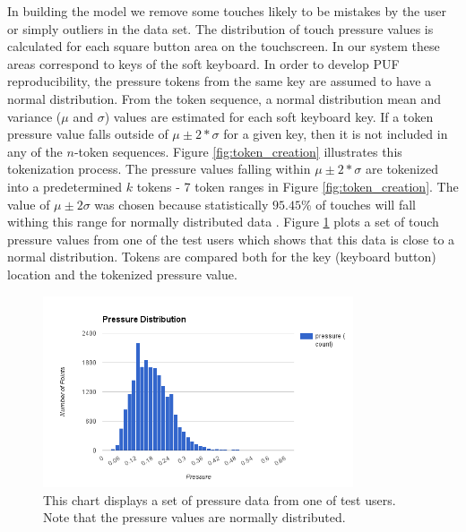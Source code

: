 \documentclass{acm_proc_article-sp}
\begin{document}
In building the model we remove some touches likely to be mistakes by the user or simply outliers in the data set.
The distribution of touch pressure values is calculated for each square button area on the touchscreen. 
In our system these areas correspond to keys of the soft keyboard. In order to develop PUF reproducibility,
the pressure tokens from the same key are assumed to have a normal distribution. 
From the token sequence, a normal distribution mean and variance ($\mu$ and $\sigma$) values are estimated for each soft keyboard key.
If a token pressure value falls outside of $\mu \pm 2*\sigma$ for a given key, 
then it is not included in any of the $n$-token sequences. 
Figure \ref{fig:token_creation} illustrates 
this tokenization process. The pressure values falling within $\mu \pm 2*\sigma$ are tokenized
into a predetermined $k$ tokens - 7 token ranges in Figure \ref{fig:token_creation}.
The value of $\mu\pm2\sigma$ was chosen because statistically $95.45$\% of touches will fall withing this range for normally distributed data \cite{threesigmarule}. Figure \ref{fig:normal_distribution} plots a set of touch pressure values from one of the test users which shows that this data is close to a normal distribution.
Tokens are compared both for the key (keyboard button) location and the tokenized pressure value.

\begin{figure}
\centering
\includegraphics[width=3.6in]{normal_distribution.png}
\caption{This chart displays a set of pressure data from one of test users. Note that the pressure values are normally distributed.}
\label{fig:normal_distribution}
\end{figure}

\end{document}
